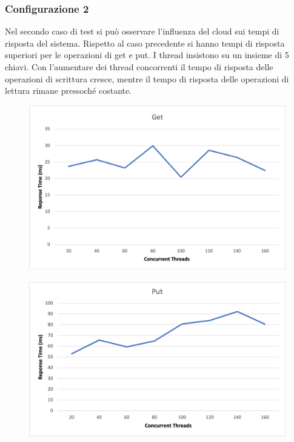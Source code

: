 \documentclass[conference]{IEEEtran}
\begin{document}
\subsubsection{Configurazione 2}
Nel secondo caso di test si può osservare l'influenza del cloud sui tempi di risposta del sistema. Rispetto al caso precedente
si hanno tempi di risposta superiori per le operazioni di get e put.
I thread insistono su un insieme di 5 chiavi.
Con l'aumentare dei thread concorrenti il tempo di risposta delle operazioni di scrittura cresce, mentre il tempo di risposta
delle operazioni di lettura rimane pressoché costante.
\begin{figure}[H]
  \includegraphics[scale=0.5]{images/get.png}
\end{figure}
\begin{figure}[H]
  \includegraphics[scale=0.5]{images/put.png}
\end{figure}
\end{document}
